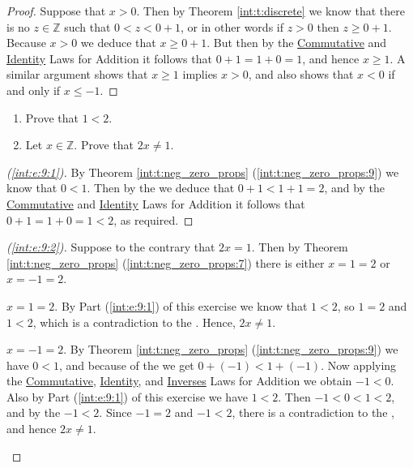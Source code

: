 \begin{proof}
	Suppose that $x > 0$. Then by Theorem \ref{int:t:discrete} we know that there is no $z \in \mathbb{Z}$ such that $0 < z < 0 + 1$, or in other words if $z > 0$ then $z \geq 0 + 1$. Because $x > 0$ we deduce that $x \geq 0 + 1$. But then by the \hyperref[int:t:props:commutative_add]{Commutative} and \hyperref[int:t:props:identity_add]{Identity} Laws for Addition it follows that $0 + 1 = 1 + 0 = 1$, and hence $x \geq 1$. A similar argument shows that $x \geq 1$ implies $x > 0$, and also shows that $x < 0$ if and only if $x \leq -1$.
\end{proof}


\Newpage
\begin{exercise} %
	\hfill
	\begin{enumerate}
		\item \label{int:e:9:1}
		      Prove that $1 < 2$.
		\item \label{int:e:9:2}
		      Let $x \in \mathbb{Z}$. Prove that $2 x \neq 1$.
	\end{enumerate}
\end{exercise}

\begin{proof}[(\ref{int:e:9:1})]
	By Theorem \ref{int:t:neg_zero_props} (\ref{int:t:neg_zero_props:9}) we know that $0 < 1$. Then by the  we deduce that $0 + 1 < 1 + 1 = 2$, and by the \hyperref[int:t:props:commutative_add]{Commutative} and \hyperref[int:t:props:identity_add]{Identity} Laws for Addition it follows that $0 + 1 = 1 + 0 = 1 < 2$, as required.
\end{proof}

\begin{proof}[(\ref{int:e:9:2})]
	Suppose to the contrary that $2x = 1$. Then by Theorem \ref{int:t:neg_zero_props} (\ref{int:t:neg_zero_props:7}) there is either $x = 1 = 2$ or $x = -1 = 2$.
	\begin{bycases}
		\item $x = 1 = 2$. By Part (\ref{int:e:9:1}) of this exercise we know that $1 < 2$, so $1 = 2$ and $1 < 2$, which is a contradiction to the . Hence, $2x \not= 1$.
		\item $x = -1 = 2$. By Theorem \ref{int:t:neg_zero_props} (\ref{int:t:neg_zero_props:9}) we have $0 < 1$, and because of the  we get $0 + (-1) < 1 + (-1)$. Now applying the \hyperref[int:t:props:commutative_add]{Commutative}, \hyperref[int:t:props:identity_add]{Identity}, and \hyperref[int:t:props:inverses_add]{Inverses} Laws for Addition we obtain $-1 < 0$. Also by Part (\ref{int:e:9:1}) of this exercise we have $1 < 2$. Then $-1 < 0 < 1 < 2$, and by the  $-1 < 2$. Since $-1 = 2$ and $-1 < 2$, there is a contradiction to the , and hence $2x \not= 1$.
	\end{bycases}
\end{proof}


